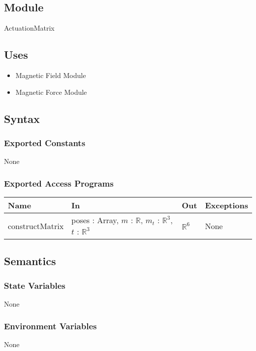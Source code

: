 \documentclass[12pt, titlepage]{article}
\begin{document}
\subsection{Module}
ActuationMatrix

\subsection{Uses}
\begin{itemize}
  \item Magnetic Field Module
  \item Magnetic Force Module 
\end{itemize}

\subsection{Syntax}

\subsubsection{Exported Constants}
None

\subsubsection{Exported Access Programs}
\begin{center}
\begin{tabular}{p{3cm} p{4cm} p{4cm} p{3cm}}
\hline
\textbf{Name} & \textbf{In} & \textbf{Out} & \textbf{Exceptions} \\
\hline
constructMatrix & poses : Array, $m$ : $\mathbb{R}$, $m_t$ : $\mathbb{R}^3$, $t$ : $\mathbb{R}^3$  & $\mathbb{R}^6$ & None \\
\hline
\end{tabular}
\end{center}

\subsection{Semantics}

\subsubsection{State Variables}
None

\subsubsection{Environment Variables}
None
\end{document}
